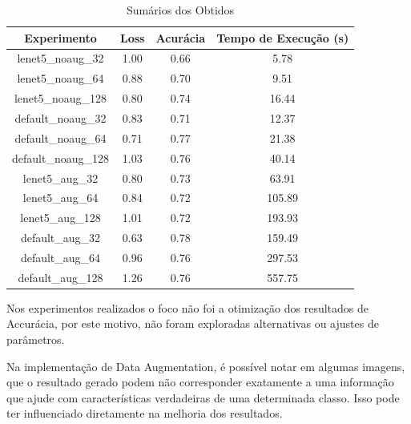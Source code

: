 \documentclass[12pt]{article}
\begin{document}
\begin{table}[!htb]
  \centering
  \begin{tabular}{|c|c|c|c|}
    \hline
    \textbf{Experimento} & \textbf{Loss} & \textbf{Acurácia} & \textbf{Tempo de Execução (s)} \\ \hline
    lenet5\_noaug\_32    & 1.00          & 0.66              & 5.78                           \\ \hline
    lenet5\_noaug\_64    & 0.88          & 0.70              & 9.51                           \\ \hline
    lenet5\_noaug\_128   & 0.80          & 0.74              & 16.44                          \\ \hline
    default\_noaug\_32   & 0.83          & 0.71              & 12.37                          \\ \hline
    default\_noaug\_64   & 0.71          & 0.77              & 21.38                          \\ \hline
    default\_noaug\_128  & 1.03          & 0.76              & 40.14                          \\ \hline
    lenet5\_aug\_32      & 0.80          & 0.73              & 63.91                          \\ \hline
    lenet5\_aug\_64      & 0.84          & 0.72              & 105.89                         \\ \hline
    lenet5\_aug\_128     & 1.01          & 0.72              & 193.93                         \\ \hline
    default\_aug\_32     & 0.63          & 0.78              & 159.49                         \\ \hline
    default\_aug\_64     & 0.96          & 0.76              & 297.53                         \\ \hline
    default\_aug\_128    & 1.26          & 0.76              & 557.75                         \\ \hline
  \end{tabular}
  \caption{Sumários dos Obtidos}
  \label{tab:summary}
\end{table}

Nos experimentos realizados o foco não foi a otimização dos resultados de Accurácia, por este motivo, não foram exploradas alternativas ou ajustes de parâmetros.

Na implementação de Data Augmentation, é possível notar em algumas imagens, que o resultado gerado podem não corresponder exatamente a uma informação que ajude com características verdadeiras de uma determinada classo. Isso pode ter influenciado diretamente na melhoria dos resultados.
\end{document}
